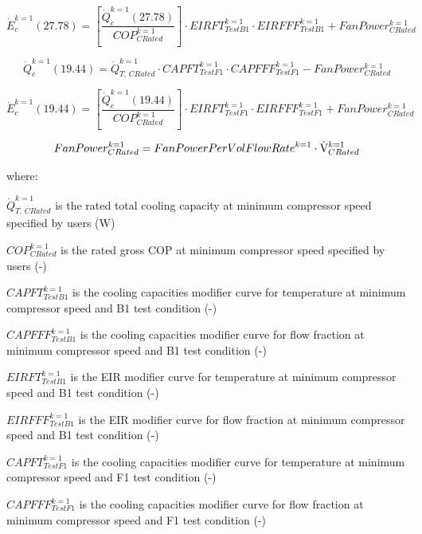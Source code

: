 \begin{equation}
\dot E_c^{k = 1}(27.78) = \left[ {\frac{{\dot Q_c^{k = 1}(27.78)}}{{COP_{CRated}^{k = 1}}}} \right] \cdot EIRFT_{TestB1}^{k = 1} \cdot EIRFFF_{TestB1}^{k = 1} + FanPower_{CRated}^{k = 1}
\end{equation}

\begin{equation}
\dot Q_c^{k = 1}(19.44) = \dot Q_{T,\,CRated}^{k = 1} \cdot CAPFT_{TestF1}^{k = 1} \cdot CAPFFF_{TestF1}^{k = 1} - FanPower_{CRated}^{k = 1}
\end{equation}

\begin{equation}
\dot E_c^{k = 1}(19.44) = \left[ {\frac{{\dot Q_c^{k = 1}(19.44)}}{{COP_{CRated}^{k = 1}}}} \right] \cdot EIRFT_{TestF1}^{k = 1} \cdot EIRFFF_{TestF1}^{k = 1} + FanPower_{CRated}^{k = 1}
\end{equation}

\begin{equation}
FanPower_{CRated}^{k = 1} = FanPowerPerVolFlowRat{e^{k = 1}} \cdot {\rm{\dot V}}_{CRated}^{k = 1}
\end{equation}

where:

\(\dot Q_{T,\,CRated}^{k = 1}\) is the rated total cooling capacity at minimum compressor speed specified by users (W)

\(COP_{CRated}^{k = 1}\) is the rated gross COP at minimum compressor speed specified by users (-)

\(CAPFT_{TestB1}^{k = 1}\) is the cooling capacities modifier curve for temperature at minimum compressor speed and B1 test condition (-)

\(CAPFFF_{TestB1}^{k = 1}\) is the cooling capacities modifier curve for flow fraction at minimum compressor speed and B1 test condition (-)

\(EIRFT_{TestB1}^{k = 1}\) is the EIR modifier curve for temperature at minimum compressor speed and B1 test condition (-)

\(EIRFFF_{TestB1}^{k = 1}\) is the EIR modifier curve for flow fraction at minimum compressor speed and B1 test condition (-)

\(CAPFT_{TestF1}^{k = 1}\) is the cooling capacities modifier curve for temperature at minimum compressor speed and F1 test condition (-)

\(CAPFFF_{TestF1}^{k = 1}\) is the cooling capacities modifier curve for flow fraction at minimum compressor speed and F1 test condition (-)

